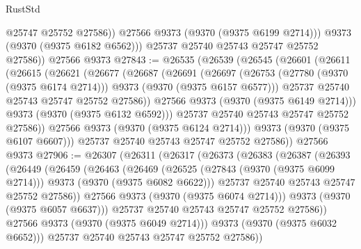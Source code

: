 \begin{lexlean}{RustStd}
\begin{coremodule}
                @25747
                @25752
                @27586))
            @27566
            @9373
            (@9370 (@9375 @6199 @2714)))
          @9373
          (@9370 (@9375 @6182 @6562)))
        @25737
        @25740
        @25743
        @25747
        @25752
        @27586))
    @27566
    @9373
@27843 := @26535
    (@26539
      (@26545
        (@26601
          (@26611
            (@26615
              (@26621
                (@26677
                  (@26687
                    (@26691
                      (@26697
                        (@26753
                          (@27780 (@9370 (@9375 @6174 @2714)))
                          @9373
                          (@9370 (@9375 @6157 @6577)))
                        @25737
                        @25740
                        @25743
                        @25747
                        @25752
                        @27586))
                    @27566
                    @9373
                    (@9370 (@9375 @6149 @2714)))
                  @9373
                  (@9370 (@9375 @6132 @6592)))
                @25737
                @25740
                @25743
                @25747
                @25752
                @27586))
            @27566
            @9373
            (@9370 (@9375 @6124 @2714)))
          @9373
          (@9370 (@9375 @6107 @6607)))
        @25737
        @25740
        @25743
        @25747
        @25752
        @27586))
    @27566
    @9373
@27906 := @26307
    (@26311
      (@26317
        (@26373
          (@26383
            (@26387
              (@26393
                (@26449
                  (@26459
                    (@26463
                      (@26469
                        (@26525
                          (@27843 (@9370 (@9375 @6099 @2714)))
                          @9373
                          (@9370 (@9375 @6082 @6622)))
                        @25737
                        @25740
                        @25743
                        @25747
                        @25752
                        @27586))
                    @27566
                    @9373
                    (@9370 (@9375 @6074 @2714)))
                  @9373
                  (@9370 (@9375 @6057 @6637)))
                @25737
                @25740
                @25743
                @25747
                @25752
                @27586))
            @27566
            @9373
            (@9370 (@9375 @6049 @2714)))
          @9373
          (@9370 (@9375 @6032 @6652)))
        @25737
        @25740
        @25743
        @25747
        @25752
        @27586))

\end{coremodule}
\end{lexlean}
